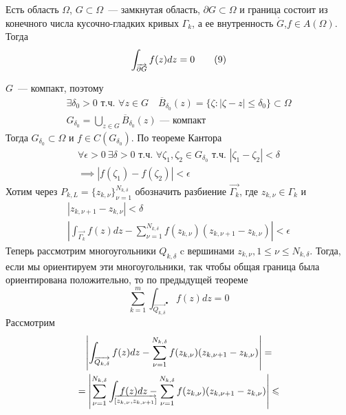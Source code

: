 \documentclass[main]{subfiles}
\begin{document}
\begin{theorem}
    Есть область $\Omega$, $G \subset \Omega$~--- замкнутая область, $\partial G \subset \Omega$ и граница состоит из конечного числа кусочно-гладких кривых $\Gamma_k$, а ее внутренность $\mathring{G}$,$f \in A(\Omega)$. Тогда
    \[\AnClOrInt[\AnClOrCurve[\partial G]] f(z) dz = 0 \tag{9}\]
\end{theorem}
\begin{longProof}
    $G$~--- компакт, поэтому
    \begin{gather*}
        \exists \delta_0 > 0 \text{ т.ч. } \forall z \in G\quad \overline{B}_{\delta_0}(z) = \{\zeta : |\zeta - z| \le \delta_0\} \subset \Omega\\
        G_{\delta_0} = \bigcup_{z \in G} \overline{B}_{\delta_0} (z)\text{ --- компакт}
    \end{gather*}
    Тогда $G_{\delta_0} \subset \Omega$ и $f \in C (G_{\delta_0})$.
    По теореме Кантора
    \begin{multline*}
        \forall \epsilon >0\ \exists \delta > 0 \text{ т.ч. }\forall \zeta_1, \zeta_2 \in G_{\delta_0} \text{ т.ч. } |\zeta_1 - \zeta_2| < \delta \\
        \implies |f(\zeta_1) - f(\zeta_2)| < \epsilon \tag{10}
    \end{multline*}
    Хотим через $P_{k,L} = \{z_{k,\nu}\}_{\nu = 1}^{N_{k,\delta}}$ обозначить разбиение $\overrightarrow{\Gamma_k}$, где $z_{k,\nu} \in \Gamma_k$ и
    \begin{gather*}
        |z_{k, \nu+1} - z_{k, \nu}| < \delta \tag{11}\\
        \left| \int_{\overrightarrow{\Gamma_k}} f(z) dz - \sum_{\nu = 1}^{N_{k,\delta}} f(z_{k,\nu}) (z_{k, \nu + 1} - z_{k, \nu}) \right| < \epsilon \tag{12} %
    \end{gather*}
    Теперь рассмотрим многоугольники $Q_{k, \delta}$ c вершинами $z_{k, \nu}, 1 \le \nu \le N_{k, \delta}$.
    Тогда, если мы ориентируем эти многоугольники, так чтобы общая граница была ориентирована положительно, то по предыдущей теореме
    \[\sum_{k=1}^{m} \int_{\overrightarrow{Q_{k, \delta}}^\bullet} f(z) dz = 0 \tag{13}\]
    Рассмотрим
    \begin{multline*}
        \left| \int_{\overrightarrow{Q_{k, \delta}}} f(z) dz  - \sum_{\nu = 1}^{N_{k, \delta}} f(z_{k, \nu}) (z_{k, \nu + 1} - z_{k, \nu})\right| = \\
        = \left| \sum_{\nu = 1}^{N_{k, \delta}} \int_{\mathrlap{\overrightarrow{[z_{k, \nu}, z_{k, \nu + 1}]}}}\  f(z) dz - \sum_{\nu = 1}^{N_{k, \delta}} f(z_{k, \nu}) (z_{k, \nu + 1} - z_{k, \nu}) \right| \le \\

\end{multline*}
\end{longProof}
\end{document}
